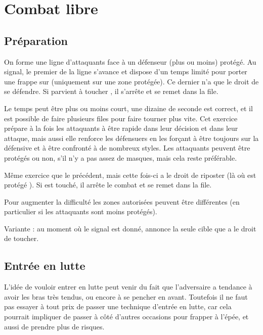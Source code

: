 \chapter{Combat libre}

\cite{boorman:hemac:applied_combatives:2014}

\section{Préparation}


\begin{exercice}

On forme une ligne d'attaquants face à un défenseur \D (plus ou moins) protégé.
Au signal, le premier de la ligne \A s'avance et dispose d'un temps limité pour porter une frappe sur \D (uniquement sur une zone protégée).
Ce dernier n'a que le droit de se défendre.
Si \A parvient à toucher \D, il s'arrête et se remet dans la file.

Le temps peut être plus ou moins court, une dizaine de seconde est correct, et il est possible de faire plusieurs files pour faire tourner plus vite.
Cet exercice prépare à la fois les attaquants à être rapide dans leur décision et dans leur attaque, mais aussi elle renforce les défensuers en les forçant à être toujours sur la défensive et à être confronté à de nombreux styles.
Les attaquants peuvent être protégés ou non, s'il n'y a pas assez de masques, mais cela reste préférable.

\end{exercice}



\begin{exercice}
Même exercice que le précédent, mais cette fois-ci \D a le droit de riposter (là où est protégé \D).
Si \A est touché, il arrête le combat et se remet dans la file.

Pour augmenter la difficulté les zones autorisées peuvent être différentes (en particulier si les attaquants sont moins protégés).

Variante : au moment où le signal est donné, \D annonce la seule cible que \A a le droit de toucher.

\end{exercice}


\section{Entrée en lutte}

L'idée de vouloir entrer en lutte peut venir du fait que l'adversaire a tendance à avoir les bras très tendus, ou encore à se pencher en avant.
Toutefois il ne faut pas essayer à tout prix de passer une technique d'entrée en lutte, car cela pourrait impliquer de passer à côté d'autres occasions pour frapper à l'épée, et aussi de prendre plus de risques.

